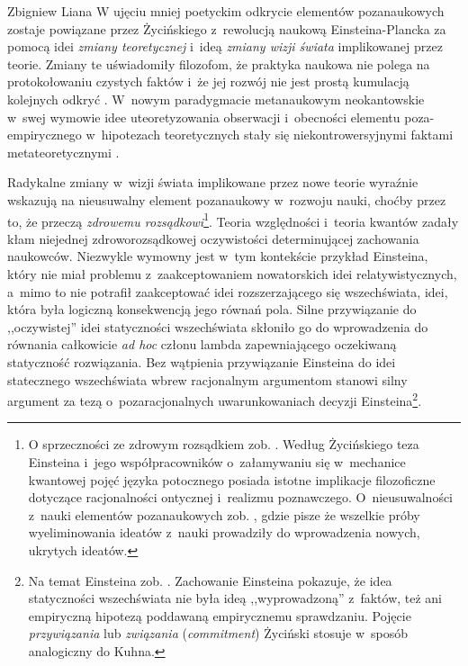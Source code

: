 \begin{artplenv}{Zbigniew Liana}
W ujęciu mniej poetyckim odkrycie elementów pozanaukowych zostaje powiązane przez Życińskiego z~rewolucją naukową
Einsteina-Plancka za pomocą idei \textit{zmiany teoretycznej} i~ideą \textit{zmiany wizji świata} implikowanej przez
teorie. Zmiany te uświadomiły filozofom, że praktyka naukowa nie polega na protokołowaniu czystych faktów
\parencites[s.~34]{zycinski_structure_1988}[s.~59]{zycinski_struktura_2013}
i~że jej rozwój nie jest prostą kumulacją
kolejnych odkryć
\parencite[zob.][s.~229]{zycinski_elementy_1996}.
W~nowym paradygmacie metanaukowym
neokantowskie w~swej wymowie idee uteoretyzowania obserwacji i~obecności elementu poza-empirycznego w~hipotezach
teoretycznych stały się niekontrowersyjnymi faktami metateoretycznymi
\parencite[por.][s.~127]{zycinski_elementy_1996}.

Radykalne zmiany w~wizji świata implikowane przez nowe teorie wyraźnie wskazują na nieusuwalny element pozanaukowy w~rozwoju
nauki, choćby przez to, że przeczą \textit{zdrowemu rozsądkowi}\footnote{O sprzeczności ze zdrowym rozsądkiem
zob.
\parencites[s.~249]{zycinski_jezyk_1983}[s.~176n]{zycinski_teizm_1985}.
Według Życińskiego teza Einsteina i~jego
współpracowników o~załamywaniu się w~mechanice kwantowej pojęć języka potocznego posiada istotne implikacje
filozoficzne dotyczące racjonalności ontycznej i~realizmu poznawczego. O~nieusuwalności z~nauki elementów pozanaukowych
zob.
\parencites[s.~34]{zycinski_structure_1988}[s.~60]{zycinski_struktura_2013},
gdzie pisze że wszelkie próby wyeliminowania
ideatów z~nauki prowadziły do wprowadzenia nowych, ukrytych ideatów.}. Teoria względności i~teoria kwantów zadały kłam
niejednej zdroworozsądkowej oczywistości determinującej zachowania naukowców. Niezwykle wymowny jest w~tym kontekście 
przykład Einsteina, który nie miał problemu z~zaakceptowaniem nowatorskich idei relatywistycznych, a~mimo to nie
potrafił zaakceptować idei rozszerzającego się wszechświata, idei, która była logiczną konsekwencją jego równań pola.
Silne przywiązanie do ,,oczywistej'' idei statyczności wszechświata skłoniło go do wprowadzenia do równania całkowicie
\textit{ad hoc} członu lambda zapewniającego oczekiwaną statyczność rozwiązania. Bez wątpienia przywiązanie Einsteina do
idei statecznego wszechświata wbrew racjonalnym argumentom stanowi silny argument za tezą o~pozaracjonalnych
uwarunkowaniach decyzji Einsteina\footnote{Na temat Einsteina zob.
\parencites[s.~249]{zycinski_jezyk_1983}[s.~73]{zycinski_structure_1988}%
[s.~130]{zycinski_struktura_2013}[s.~189]{zycinski_elementy_1996}.
Zachowanie Einsteina pokazuje, że idea statyczności wszechświata nie była
ideą ,,wyprowadzoną'' z~faktów, też ani empiryczną hipotezą poddawaną empirycznemu sprawdzaniu. Pojęcie
\textit{przywiązania} lub \textit{związania} (\textit{commitment}) Życiński stosuje w~sposób analogiczny do Kuhna.}.


\end{artplenv}
